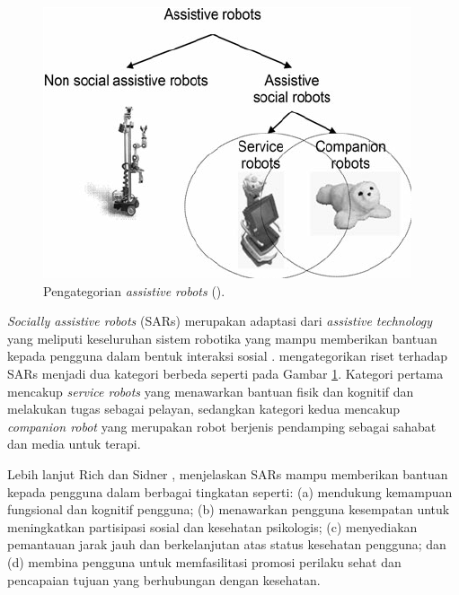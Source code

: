 
\begin{figure}[ht]
  \centering
  \includegraphics[scale=0.35]{gambar/kategori-sars.png}
  \caption{Pengategorian \emph{assistive robots} (\citet{cit:heerink2010}).}
  \label{fig:kategorisars}
\end{figure}

\emph{Socially assistive robots} (SARs) merupakan adaptasi dari \emph{assistive technology} yang meliputi keseluruhan sistem robotika yang mampu memberikan bantuan kepada pengguna dalam bentuk interaksi sosial \citep{cit:seifer2005}. \citet{cit:heerink2010} mengategorikan riset terhadap SARs menjadi dua kategori berbeda seperti pada Gambar \ref{fig:kategorisars}.
Kategori pertama mencakup \emph{service robots} yang menawarkan bantuan fisik dan kognitif dan melakukan tugas sebagai pelayan, sedangkan kategori kedua mencakup \emph{companion robot} yang merupakan robot berjenis pendamping sebagai sahabat dan media untuk terapi.

Lebih lanjut Rich dan Sidner \citep{cit:rich2009}, menjelaskan SARs mampu memberikan bantuan kepada pengguna dalam berbagai tingkatan seperti:
(a) mendukung kemampuan fungsional dan kognitif pengguna;
(b) menawarkan pengguna kesempatan untuk meningkatkan partisipasi sosial dan kesehatan psikologis;
(c) menyediakan pemantauan jarak jauh dan berkelanjutan atas status kesehatan pengguna;
dan (d) membina pengguna untuk memfasilitasi promosi perilaku sehat dan pencapaian tujuan yang berhubungan dengan kesehatan.
